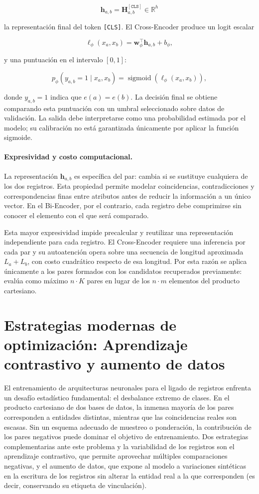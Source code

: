 \[
\mathbf h_{a,b}
=
\mathbf H_{a,b}^{[\texttt{CLS}]}
\in\mathbb R^h
\]

la representación final del token \texttt{[CLS]}. El Cross-Encoder produce un logit escalar

\[
\ell_\phi(x_a,x_b)
=
\mathbf w_\phi^\top\mathbf h_{a,b}+b_\phi,
\]

y una puntuación en el intervalo $[0,1]$:

\[
p_\phi(y_{a,b}=1\mid x_a,x_b)
=
\operatorname{sigmoid}\!\left(\ell_\phi(x_a,x_b)\right),
\]

donde $y_{a,b}=1$ indica que $e(a)=e(b)$. La decisión final se obtiene comparando esta puntuación con un umbral seleccionado sobre datos de validación. La salida debe interpretarse como una probabilidad estimada por el modelo; su calibración no está garantizada únicamente por aplicar la función sigmoide.

\paragraph{Expresividad y costo computacional.}
La representación $\mathbf h_{a,b}$ es específica del par: cambia si se sustituye cualquiera de los dos registros. Esta propiedad permite modelar coincidencias, contradicciones y correspondencias finas entre atributos antes de reducir la información a un único vector. En el Bi-Encoder, por el contrario, cada registro debe comprimirse sin conocer el elemento con el que será comparado.

Esta mayor expresividad impide precalcular y reutilizar una representación independiente para cada registro. El Cross-Encoder requiere una inferencia por cada par y su autoatención opera sobre una secuencia de longitud aproximada $L_a+L_b$, con costo cuadrático respecto de esa longitud. Por esta razón se aplica únicamente a los pares formados con los candidatos recuperados previamente: evalúa como máximo $n\cdot K$ pares en lugar de los $n\cdot m$ elementos del producto cartesiano.



\section{Estrategias modernas de optimización: Aprendizaje contrastivo y aumento de datos}

El entrenamiento de arquitecturas neuronales para el ligado de registros enfrenta un desafío estadístico fundamental: el desbalance extremo de clases. En el producto cartesiano de dos bases de datos, la inmensa mayoría de los pares corresponden a entidades distintas, mientras que las coincidencias reales son escasas. Sin un esquema adecuado de muestreo o ponderación, la contribución de los pares negativos puede dominar el objetivo de entrenamiento. Dos estrategias complementarias ante este problema y la variabilidad de los registros son el aprendizaje contrastivo, que permite aprovechar múltiples comparaciones negativas, y el aumento de datos, que expone al modelo a variaciones sintéticas en la escritura de los registros sin alterar la entidad real a la que corresponden (es decir, conservando su etiqueta de vinculación).


